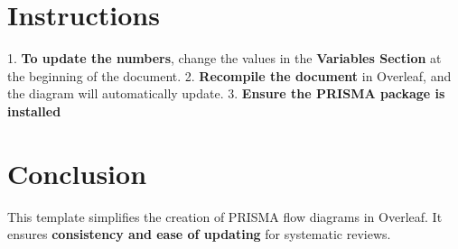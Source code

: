 \documentclass{article}
\begin{document}
\section{Instructions}
1. \textbf{To update the numbers}, change the values in the \textbf{Variables Section} at the beginning of the document.
2. \textbf{Recompile the document} in Overleaf, and the diagram will automatically update.
3. \textbf{Ensure the PRISMA package is installed}

\section{Conclusion}
This template simplifies the creation of PRISMA flow diagrams in Overleaf. It ensures \textbf{consistency and ease of updating} for systematic reviews.
\end{document}
